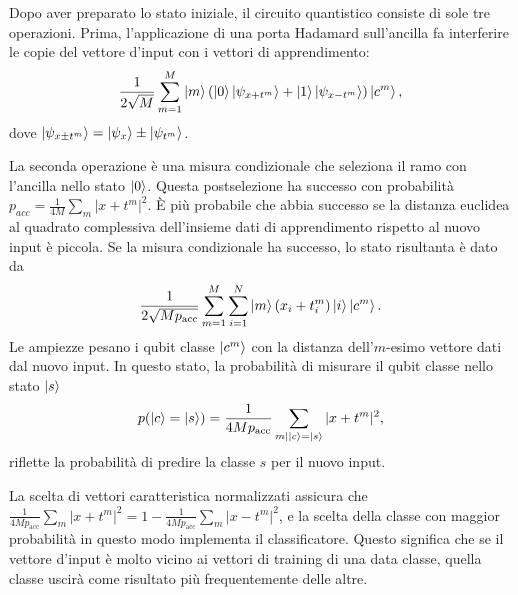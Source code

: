 Dopo aver preparato lo stato iniziale, il circuito quantistico 
consiste di sole tre operazioni. Prima, l'applicazione di 
una porta Hadamard sull'ancilla fa interferire le copie 
del vettore d'input con i vettori di apprendimento: 
\begin{equation}
    \frac{1}{2\sqrt{M}} \sum_{m=1}^M \ket{m}
    \left( \ket{0}\ket{\psi_{x+t^m}} + \ket{1}  
    \ket{\psi_{x-t^m}} \right) \ket{c^m},
\end{equation}
dove $\ket{\psi_{x \pm t^m}} = \ket{\psi_x} \pm \ket{\psi_{t^m}}$. 

La seconda operazione è una misura condizionale che seleziona 
il ramo con l'ancilla nello stato $\ket{0}$. Questa 
postselezione ha successo con probabilità 
$p_{acc} = \frac{1}{4M}\sum_m |x+t^m|^2$. 
È più probabile che abbia successo se la distanza euclidea 
al quadrato complessiva dell'insieme dati di apprendimento 
rispetto al nuovo input è piccola. 
Se la misura condizionale ha successo, lo stato risultanta 
è dato da 
\begin{equation}
    \frac{1}{2\sqrt{Mp_{\text{acc}}}} \sum_{m=1}^M \sum_{i=1}^N 
    \ket{m} ( x_i + t_i^m ) \ket{i} \ket{c^m}.
\end{equation}
Le ampiezze pesano i qubit classe $\ket{c^m}$ con la 
distanza dell'$m$-esimo vettore dati dal nuovo input. 
In questo stato, la probabilità di misurare il qubit 
classe nello stato $\ket{s}$ 
\begin{equation}
    p(\ket{c}=\ket{s}) = \frac{1}{4Mp_{\text{acc}}} 
    \sum_{m|\ket{c}=\ket{s}} |x+t^m|^2,
\end{equation}
riflette la probabilità di predire la classe $s$ per il 
nuovo input. 

La scelta di vettori caratteristica normalizzati assicura che \\ 
$\frac{1}{4Mp_{\text{acc}}}\sum_m |x+t^m|^2 = 
1 - \frac{1}{4Mp_{\text{acc}}}\sum_m |x-t^m|^2$, e la scelta 
della classe con maggior probabilità in questo modo 
implementa il classificatore. 
Questo significa che se il vettore d'input è molto 
vicino ai vettori di training di una data classe, 
quella classe uscirà come risultato più frequentemente 
delle altre. 


